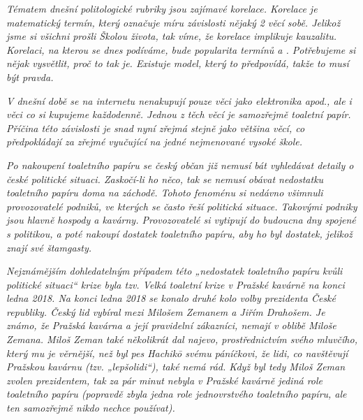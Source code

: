 \documentclass[12pt, a4paper]{article}
\begin{document}
\textit{Tématem dnešní politologické rubriky jsou zajímavé korelace. Korelace je matematický termín, který označuje míru závislosti nějaký 2 věcí sobě. Jelikož jsme si všichni prošli Školou života, tak víme, že korelace implikuje kauzalitu. Korelaci, na kterou se dnes podíváme, bude popularita termínů  a . Potřebujeme si nějak vysvětlit, proč to tak je. Existuje model, který to předpovídá, takže to musí být pravda. }

\textit{V dnešní době se na internetu nenakupují pouze věci jako elektronika apod., ale i věci co si kupujeme každodenně. Jednou z těch věcí je samozřejmě toaletní papír. Příčina této závislosti je snad nyní zřejmá stejně jako většina věcí, co předpokládají za zřejmé vyučující na jedné nejmenované vysoké škole.}

\textit{Po nakoupení toaletního papíru se český občan již nemusí bát vyhledávat detaily o české politické situaci. Zaskočí-li ho něco, tak se nemusí obávat nedostatku toaletního papíru doma na záchodě. Tohoto fenoménu si nedávno všimnuli provozovatelé podniků, ve kterých se často řeší politická situace. Takovými podniky jsou hlavně hospody a kavárny. Provozovatelé si vytipují do budoucna dny spojené s politikou, a poté nakoupí dostatek toaletního papíru, aby ho byl dostatek, jelikož znají své štamgasty.}

\textit{Nejznámějším dohledatelným případem této „nedostatek toaletního papíru kvůli politické situaci“ krize byla tzv. Velká toaletní krize v Pražské kavárně na konci ledna 2018. Na konci ledna 2018 se konalo druhé kolo volby prezidenta České republiky. Český lid vybíral mezi Milošem Zemanem a Jiřím Drahošem. Je známo, že Pražská kavárna a její pravidelní zákazníci, nemají v oblibě Miloše Zemana. Miloš Zeman také několikrát dal najevo, prostřednictvím svého mluvčího, který mu je věrnější, než byl pes Hachikō svému páníčkovi, že lidi, co navštěvují Pražskou kavárnu (tzv. „lepšolidi“), také nemá rád. Když byl tedy Miloš Zeman zvolen prezidentem, tak za pár minut nebyla v Pražské kavárně jediná role toaletního papíru (popravdě zbyla jedna role jednovrstvého toaletního papíru, ale ten samozřejmě nikdo nechce používat).}
\end{document}
